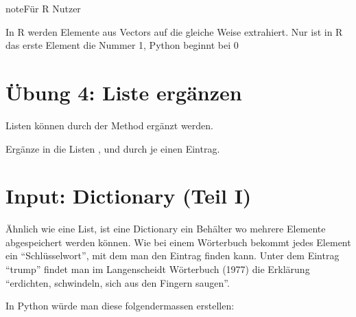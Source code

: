 \documentclass[letterpaper,10pt,english]{sphinxmanual}
\begin{document}
\begin{sphinxadmonition}{note}{Für R Nutzer}

In R werden Elemente aus Vectors auf die gleiche Weise extrahiert. Nur ist in R das erste Element die Nummer 1, Python beginnt bei 0
\end{sphinxadmonition}


\section{Übung 4: Liste ergänzen}
\label{\detokenize{01_02_Python_Basics:ubung-4-liste-erganzen}}
Listen können durch der Method  ergänzt werden.

\begin{sphinxVerbatim}[commandchars=\\\{\}]
\end{sphinxVerbatim}

Ergänze in die Listen ,  und  durch je einen Eintrag.

\begin{sphinxVerbatim}[commandchars=\\\{\}]

\end{sphinxVerbatim}


\section{Input: Dictionary (Teil I)}
\label{\detokenize{01_02_Python_Basics:input-dictionary-teil-i}}
Ähnlich wie eine List, ist eine Dictionary ein Behälter wo mehrere Elemente abgespeichert werden können. Wie bei einem Wörterbuch bekommt jedes Element ein “Schlüsselwort”, mit dem man den Eintrag finden kann.
Unter dem Eintrag “trump” findet man im Langenscheidt Wörterbuch (1977) die Erklärung “erdichten, schwindeln, sich aus den Fingern saugen”.


In Python würde man diese  folgendermassen erstellen:
\end{document}
